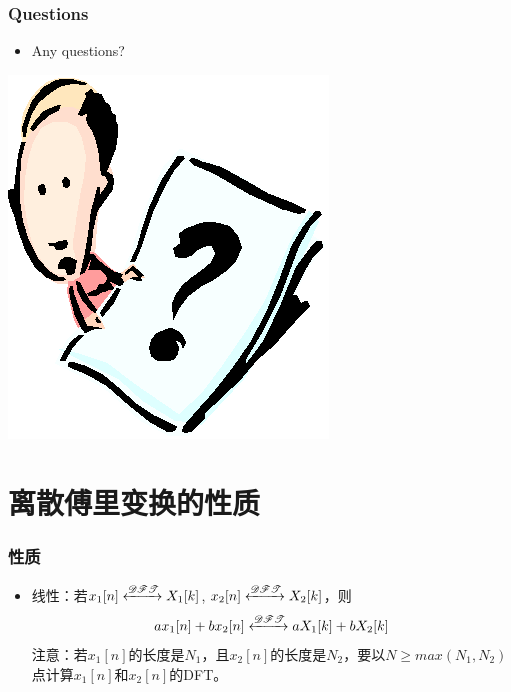 \documentclass[CJKutf8,dvipsnames,table]{beamer}
\begin{document}
\begin{CJK*}{UTF8}{song}
  \begin{frame}
    \frametitle{Questions}
    \begin{itemize}
    \item Any questions?
    \end{itemize}
    \begin{center}
      \includegraphics[scale=.5]{question}
    \end{center}
  \end{frame}   
  
	\section{离散傅里变换的性质}
	
  \begin{frame}
    \frametitle{性质}
    \begin{itemize}
    \item 线性：若$x_1[n] \xleftrightarrow{\mathscr{DFT}} X_1[k]$, $x_2[n] \xleftrightarrow{\mathscr{DFT}} X_2[k]$，则
    \[
    ax_1[n]+bx_2[n] \xleftrightarrow{\mathscr{DFT}} aX_1[k]+bX_2[k]
    \]
    注意：若$x_1[n]$的长度是$N_1$，且$x_2[n]$的长度是$N_2$，要以$N \geq max(N_1, N_2)$点计算$x_1[n]$和$x_2[n]$的DFT。

	\end{itemize}
  \end{frame}  
      

\end{CJK*}
\end{document}
